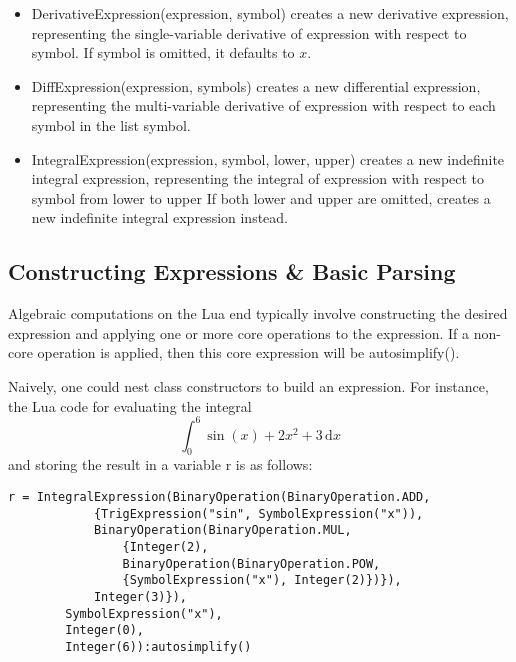\documentclass{article}
\begin{document}
\begin{itemize}
    \item {\ttfamily DerivativeExpression(expression, symbol)} creates a new derivative expression, representing the single-variable derivative of {\ttfamily expression} with respect to {\ttfamily symbol}. If {\ttfamily symbol} is omitted, it defaults to $x$.
    
    \item {\ttfamily DiffExpression(expression, symbols)} creates a new differential expression, representing the multi-variable derivative of {\ttfamily expression} with respect to each symbol in the list {\ttfamily symbol}.
    
    \item {\ttfamily IntegralExpression(expression, symbol, lower, upper)} creates a new indefinite integral expression, representing the integral of {\ttfamily expression} with respect to {\ttfamily symbol} from {\ttfamily lower} to {\ttfamily upper} If both {\ttfamily lower} and {\ttfamily upper} are omitted, creates a new indefinite integral expression instead.
\end{itemize}

\subsection{Constructing Expressions \& Basic Parsing}

Algebraic computations on the Lua end typically involve constructing the desired expression and applying one or more core operations to the expression. If a non-core operation is applied, then this core expression will be {\ttfamily autosimplify()}.

Naively, one could nest class constructors to build an expression. For instance, the Lua code for evaluating the integral \[ \int_0^6 \sin(x) + 2x^2 + 3 \hspace{2pt}\mathrm{d}x\] and storing the result in a variable {\ttfamily r} is as follows:

\begin{verbatim}
r = IntegralExpression(BinaryOperation(BinaryOperation.ADD,
            {TrigExpression("sin", SymbolExpression("x")),
            BinaryOperation(BinaryOperation.MUL,
                {Integer(2),
                BinaryOperation(BinaryOperation.POW,
                {SymbolExpression("x"), Integer(2)})}),
            Integer(3)}),
        SymbolExpression("x"),
        Integer(0),
        Integer(6)):autosimplify()
\end{verbatim}
\end{document}
